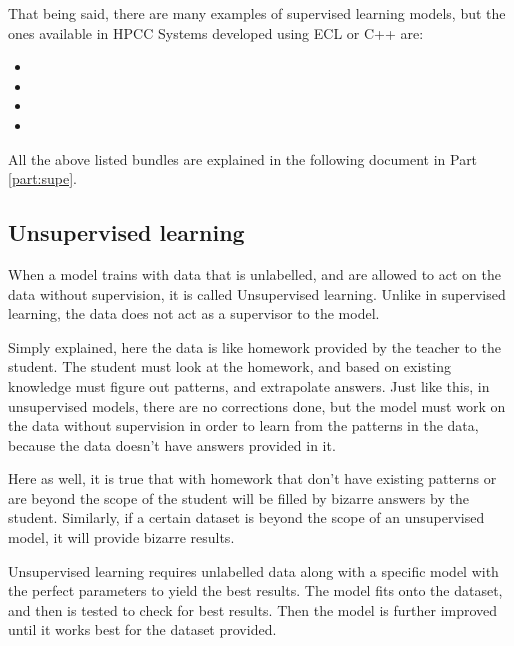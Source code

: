 \documentclass[a4paper,oneside,12pt]{book}
\begin{document}
That being said, there are many examples of supervised learning models, but the ones available in HPCC Systems developed using ECL or C++ are: 

\begin{itemize}
    \item {}
    \item {}
    \item {}
    \item {}
\end{itemize}

All the above listed bundles are explained in the following document in Part \ref{part:supe}.

\subsection{Unsupervised learning}\label{subsec:unsupe}

When a model trains with data that is unlabelled, and are allowed to act on the data without supervision, it is called Unsupervised learning. Unlike in supervised learning, the data does not act as a supervisor to the model.

Simply explained, here the data is like homework provided by the teacher to the student. The student must look at the homework, and based on existing knowledge must figure out patterns, and extrapolate answers. Just like this, in unsupervised models, there are no corrections done, but the model must work on the data without supervision in order to learn from the patterns in the data, because the data doesn't have answers provided in it. 

Here as well, it is true that with homework that don't have existing patterns or are beyond the scope of the student will be filled by bizarre answers by the student. Similarly, if a certain dataset is beyond the scope of an unsupervised model, it will provide bizarre results.

Unsupervised learning requires unlabelled data along with a specific model with the perfect parameters to yield the best results. The model fits onto the dataset, and then is tested to check for best results. Then the model is further improved until it works best for the dataset provided.
\\
\end{document}

